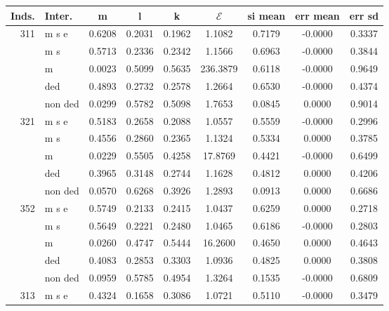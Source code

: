\documentclass{standalone}
\begin{document}
\begin{tabular}{rlccccccc} \toprule
Inds.& Inter.& m  & l  & k  & $\mathcal{E}$  & si mean  & err mean  & err sd  \\  \hline
311& m s e &    0.6208 &    0.2031 &    0.1962 &    1.1082 &    0.7179 &   -0.0000 &    0.3337 \\  
& m s &    0.5713 &    0.2336 &    0.2342 &    1.1566 &    0.6963 &   -0.0000 &    0.3844 \\  
& m &    0.0023 &    0.5099 &    0.5635 &  236.3879 &    0.6118 &   -0.0000 &    0.9649 \\  
& ded &    0.4893 &    0.2732 &    0.2578 &    1.2664 &    0.6530 &   -0.0000 &    0.4374 \\  
& non ded &    0.0299 &    0.5782 &    0.5098 &    1.7653 &    0.0845 &    0.0000 &    0.9014 \\  \hline
321& m s e &    0.5183 &    0.2658 &    0.2088 &    1.0557 &    0.5559 &   -0.0000 &    0.2996 \\  
& m s &    0.4556 &    0.2860 &    0.2365 &    1.1324 &    0.5334 &    0.0000 &    0.3785 \\  
& m &    0.0229 &    0.5505 &    0.4258 &   17.8769 &    0.4421 &   -0.0000 &    0.6499 \\  
& ded &    0.3965 &    0.3148 &    0.2744 &    1.1628 &    0.4812 &    0.0000 &    0.4206 \\  
& non ded &    0.0570 &    0.6268 &    0.3926 &    1.2893 &    0.0913 &    0.0000 &    0.6686 \\  \hline
352& m s e &    0.5749 &    0.2133 &    0.2415 &    1.0437 &    0.6259 &    0.0000 &    0.2718 \\  
& m s &    0.5649 &    0.2221 &    0.2480 &    1.0465 &    0.6186 &   -0.0000 &    0.2803 \\  
& m &    0.0260 &    0.4747 &    0.5444 &   16.2600 &    0.4650 &    0.0000 &    0.4643 \\  
& ded &    0.4083 &    0.2853 &    0.3303 &    1.0936 &    0.4825 &    0.0000 &    0.3808 \\  
& non ded &    0.0959 &    0.5785 &    0.4954 &    1.3264 &    0.1535 &   -0.0000 &    0.6809 \\  \hline
313& m s e &    0.4324 &    0.1658 &    0.3086 &    1.0721 &    0.5110 &   -0.0000 &    0.3479 \\  

\end{tabular}
\end{document}
